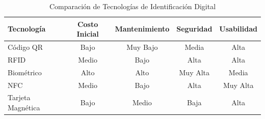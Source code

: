 \begin{table}[htbp]
\centering
\caption{Comparación de Tecnologías de Identificación Digital}
\label{tab:tecnologias}
\small
\begin{tabular}{@{}lcccc@{}}
\toprule
\textbf{Tecnología} & \textbf{Costo Inicial} & \textbf{Mantenimiento} & \textbf{Seguridad} & \textbf{Usabilidad} \\
\midrule
Código QR & Bajo & Muy Bajo & Media & Alta \\
RFID & Medio & Bajo & Alta & Alta \\
Biométrico & Alto & Alto & Muy Alta & Media \\
NFC & Medio & Bajo & Alta & Muy Alta \\
Tarjeta Magnética & Bajo & Medio & Baja & Alta \\
\bottomrule
\end{tabular}
\end{table}